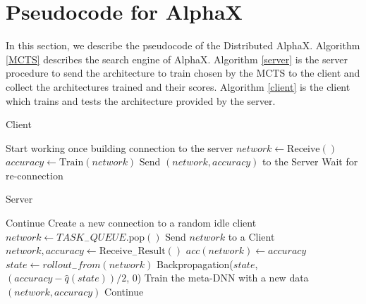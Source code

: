 \documentclass[10pt,twocolumn,letterpaper]{article}
\begin{document}
{\small


}



\newpage



\section{Pseudocode for AlphaX}
\label{ap:pseudocode}



In this section, we describe the pseudocode of the Distributed AlphaX. Algorithm \ref{MCTS} describes the search engine of AlphaX.
Algorithm \ref{server} is the server procedure to send the architecture to train chosen by the MCTS to the client and collect the architectures trained and their scores. Algorithm \ref{client} is the client which trains and tests the architecture provided by the server.


\begin{algorithm}[H]
  \caption{Client}
  \label{client}
    \begin{algorithmic}[1]
       Start working once building connection to the server
       \STATE $network \leftarrow \text{Receive}()$
       \STATE $accuracy \leftarrow \text{Train}(network)$
       \STATE Send $(network, accuracy)$ to the Server
      \ELSE
      \STATE Wait for re-connection
      \ENDIF
      \ENDWHILE
    \end{algorithmic}
\end{algorithm}

\begin{algorithm}[H]
  \caption{Server}
  \label{server}
    \begin{algorithmic}[1]


      \STATE Continue 
      \ENDWHILE
      \STATE Create a new connection to a random idle client
      \STATE $network \leftarrow TASK_{-}QUEUE.\text{pop}()$
      \STATE Send $network$ to a Client
\STATE $network, accuracy \leftarrow \text{Receive}_{-}\text{Result}()$
      \STATE $acc(network) \leftarrow accuracy$
\STATE $state \leftarrow rollout_{-}from(network)$
      \STATE Backpropagation($state$, $(accuracy - \hat{q}(state)) / 2$, 0) 
      \STATE Train the meta-DNN with a new data $(network, accuracy)$
      \ELSE 
      \STATE Continue 
      \ENDIF
      \ENDWHILE
    \end{algorithmic}
\end{algorithm}
\end{document}
